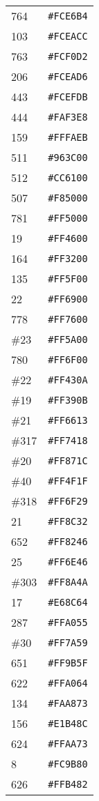 \documentclass[a4paper]{article}
\begin{document}
\begin{longtable}{|l|r|}
764 & \texttt{\#FCE6B4} \\
103 & \texttt{\#FCEACC} \\
763 & \texttt{\#FCF0D2} \\
206 & \texttt{\#FCEAD6} \\
443 & \texttt{\#FCEFDB} \\
444 & \texttt{\#FAF3E8} \\
159 & \texttt{\#FFFAEB} \\
511 & \texttt{\#963C00} \\
512 & \texttt{\#CC6100} \\
507 & \texttt{\#F85000} \\
781 & \texttt{\#FF5000} \\
19 & \texttt{\#FF4600} \\
164 & \texttt{\#FF3200} \\
135 & \texttt{\#FF5F00} \\
22 & \texttt{\#FF6900} \\
778 & \texttt{\#FF7600} \\
\#23 & \texttt{\#FF5A00} \\
780 & \texttt{\#FF6F00} \\
\#22 & \texttt{\#FF430A} \\
\#19 & \texttt{\#FF390B} \\
\#21 & \texttt{\#FF6613} \\
\#317 & \texttt{\#FF7418} \\
\#20 & \texttt{\#FF871C} \\
\#40 & \texttt{\#FF4F1F} \\
\#318 & \texttt{\#FF6F29} \\
21 & \texttt{\#FF8C32} \\
652 & \texttt{\#FF8246} \\
25 & \texttt{\#FF6E46} \\
\#303 & \texttt{\#FF8A4A} \\
17 & \texttt{\#E68C64} \\
287 & \texttt{\#FFA055} \\
\#30 & \texttt{\#FF7A59} \\
651 & \texttt{\#FF9B5F} \\
622 & \texttt{\#FFA064} \\
134 & \texttt{\#FAA873} \\
156 & \texttt{\#E1B48C} \\
624 & \texttt{\#FFAA73} \\
8 & \texttt{\#FC9B80} \\
626 & \texttt{\#FFB482} \\

\end{longtable}
\end{document}
